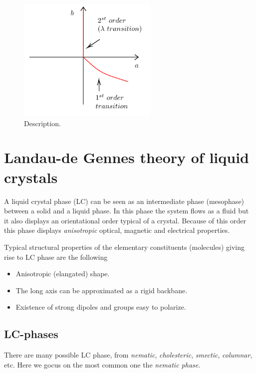 \documentclass[../main/main.tex]{subfiles}
\begin{document}
\begin{itemize}
\begin{figure}[h!]
\centering
\includegraphics[width=0.6\textwidth]{../lessons/16_image/8.pdf}
\caption{\label{fig:16_8} Description.}
\end{figure}

\end{itemize}

\section{Landau-de Gennes theory of liquid crystals}
A liquid crystal phase (LC) can be seen as an intermediate phase (mesophase) between a solid and a liquid phase.
In this phase the system flows as a fluid but it also displays an orientational order typical of a crystal. Because of this order this phase displays \emph{anisotropic} optical, magnetic and electrical properties.

Typical structural properties of the elementary constituents (molecules) giving rise to LC phase are the following
\begin{itemize}
\item Anisotropic (elangated) shape.
\item The long axis can be approximated as a rigid backbane.
\item Existence of strong dipoles and groups easy to polarize.
\end{itemize}
\subsection{LC-phases}
There are many possible LC phase, from \emph{nematic}, \emph{cholesteric}, \emph{smectic}, \emph{columnar}, etc. Here we gocus on the most common one the \emph{nematic phase}.
\end{document}
